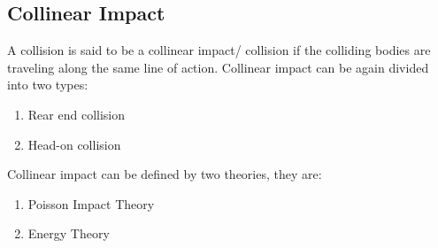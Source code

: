 \subsection{Collinear Impact}
A collision is said to be a collinear impact/ collision if the colliding bodies are traveling along the same line of action. Collinear impact can be again divided into two types:
\begin{enumerate}
	\item Rear end collision
	\item Head-on collision
\end{enumerate}
Collinear impact can be defined by two theories, they are:
\begin{enumerate}
	\item Poisson Impact Theory
	\item Energy Theory
\end{enumerate}
